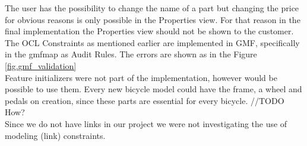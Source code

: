 \noindent The user has the possibility to change the name of a part but changing
the price for obvious reasons is only possible in the Properties view. For that
reason in the final implementation the Properties view should not be shown to
the customer. The OCL Constraints as mentioned earlier are implemented in GMF,
specifically in the gmfmap as Audit Rules.
The errors are shown as in the Figure \ref{fig.gmf_validation}\\

\noindent Feature initializers were not part of the implementation, however
would be possible to use them. Every new bicycle model could have the frame, a
wheel and pedals on creation, since these parts are essential for every
bicycle. //TODO How?\\

\noindent Since we do not have links in our project we were not investigating
the use of modeling (link) constraints.\\

